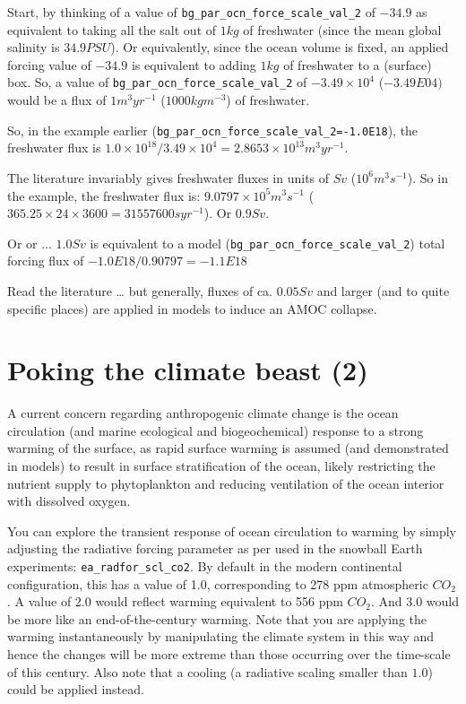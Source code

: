 Start, by thinking of a value of \texttt{bg\_par\_ocn\_force\_scale\_val\_2} of \(-34.9\) as equivalent to taking all the salt out of \(1 kg\) of freshwater (since the mean global salinity is \(34.9 PSU\)). Or equivalently, since the ocean volume is fixed, an applied forcing value of \(-34.9\) is equivalent to adding \(1 kg\) of freshwater to a (surface) box. So, a value of \texttt{bg\_par\_ocn\_force\_scale\_val\_2} of \(-3.49\times10^{4}\) (\(-3.49E04)\) would be a flux of \(1 m^{3} yr^{-1}\) (\(1000 kg m^{-3}\)) of freshwater.

So, in the example earlier (\texttt{bg\_par\_ocn\_force\_scale\_val\_2=-1.0E18}), the freshwater flux is \(1.0\times10^{18}/3.49\times10^{4} = 2.8653\times10^{13} m^{3} yr^{-1}\).

The literature invariably gives freshwater fluxes in units of \(Sv\) (\(10^{6} m^{3} s^{-1}\)). So in the example, the freshwater flux is: \(9.0797\times10^{5} m^{3} s^{-1}\) (\(365.25\times24\times3600 = 31557600 s yr^{-1}\)). Or \(0.9 Sv\).

Or or ... \(1.0 Sv\) is equivalent to a model (\texttt{bg\_par\_ocn\_force\_scale\_val\_2}) total forcing flux of \(-1.0E18/0.90797 = -1.1E18\)

Read the literature … but generally, fluxes of ca. \(0.05 Sv\) and larger (and to quite specific places) are applied in models to induce an AMOC collapse.

\newpage

\section{Poking the climate beast (2)}

A current concern regarding anthropogenic climate change is the ocean circulation (and marine ecological and biogeochemical) response to a strong warming of the surface, as rapid surface warming is assumed (and demonstrated in models) to result in surface stratification of the ocean, likely restricting the nutrient supply to phytoplankton and reducing ventilation of the ocean interior with dissolved oxygen.

You can explore the transient response of ocean circulation to warming by simply adjusting the radiative forcing parameter as per used in the snowball Earth experiments: \texttt{ea\_radfor\_scl\_co2}. By default in the modern continental configuration, this has a value of 1.0, corresponding to 278 ppm atmospheric \(CO_{2}\). A value of 2.0 would reflect warming equivalent to 556 ppm \(CO_{2}\). And 3.0 would be more like an end-of-the-century warming. Note that you are applying the warming instantaneously by manipulating the climate system in this way and hence the changes will be more extreme than those occurring over the time-scale of this century. Also note that a cooling (a radiative scaling smaller than $1.0$) could be applied instead.

